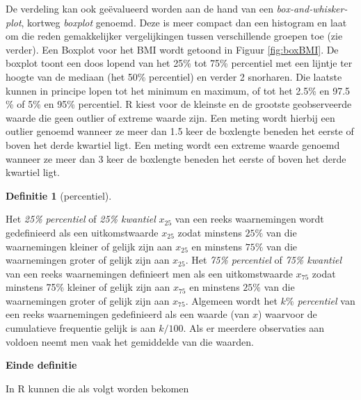 \documentclass[
  12pt,dutch]{book}
\newenvironment{Shaded}{\begin{snugshade}}{\end{snugshade}}
\newcommand{\AttributeTok}[1]{\textcolor[rgb]{0.13,0.29,0.53}{#1}}
\newcommand{\ConstantTok}[1]{\textcolor[rgb]{0.56,0.35,0.01}{#1}}
\newcommand{\FloatTok}[1]{\textcolor[rgb]{0.00,0.00,0.81}{#1}}
\newcommand{\FunctionTok}[1]{\textcolor[rgb]{0.13,0.29,0.53}{\textbf{#1}}}
\newcommand{\NormalTok}[1]{#1}
\newcommand{\SpecialCharTok}[1]{\textcolor[rgb]{0.81,0.36,0.00}{\textbf{#1}}}
\theoremstyle{definition}
\newtheorem{definition}{Definitie}[chapter]
\theoremstyle{definition}
\theoremstyle{definition}
\theoremstyle{definition}
\theoremstyle{remark}
\begin{document}
De verdeling kan ook geëvalueerd worden aan de hand van een \emph{box-and-whisker-plot}, kortweg \emph{boxplot} genoemd. Deze is
meer compact dan een histogram en laat om die reden gemakkelijker
vergelijkingen tussen verschillende groepen toe (zie verder). Een Boxplot voor het BMI wordt getoond in Figuur \ref{fig:boxBMI}. De boxplot toont een
doos lopend van het 25\% tot 75\% percentiel met een lijntje ter hoogte van de
mediaan (het 50\% percentiel) en verder 2 snorharen. Die laatste kunnen in principe lopen tot het
minimum en maximum, of tot het 2.5\% en 97.5 \% of 5\% en 95\% percentiel.
R kiest voor de kleinste en de grootste geobserveerde waarde die geen
outlier of extreme waarde zijn. Een meting wordt hierbij een outlier genoemd
wanneer ze meer dan 1.5 keer de boxlengte beneden het eerste of boven het
derde kwartiel ligt. Een meting wordt een extreme waarde genoemd wanneer ze
meer dan 3 keer de boxlengte beneden het eerste of boven het derde kwartiel
ligt.

\begin{definition}[percentiel]
\protect\hypertarget{def:unnamed-chunk-90}{}\label{def:unnamed-chunk-90}~
\end{definition}

Het \emph{25\% percentiel} of \emph{25\% kwantiel} \(x_{25}\) van een
reeks waarnemingen wordt gedefinieerd als een uitkomstwaarde \(x_{25}\) zodat
minstens \(25\%\) van die waarnemingen kleiner of gelijk zijn aan \(x_{25}\) en
minstens \(75\%\) van die waarnemingen groter of gelijk zijn aan \(x_{25}\). Het
\emph{75\% percentiel} of \emph{75\% kwantiel} van een reeks
waarnemingen definieert men als een uitkomstwaarde \(x_{75}\) zodat minstens 75\%
kleiner of gelijk zijn aan \(x_{75}\) en minstens \(25\%\) van die waarnemingen
groter of gelijk zijn aan \(x_{75}\). Algemeen wordt het \emph{\(k\%\)
percentiel} van een reeks waarnemingen gedefinieerd als een waarde (van \(x\))
waarvoor de cumulatieve frequentie gelijk is aan \(k/100.\) Als er meerdere
observaties aan voldoen neemt men vaak het gemiddelde van die waarden.

\textbf{Einde definitie}

In R kunnen die als volgt worden bekomen

\begin{Shaded}
\end{Shaded}
\end{document}
